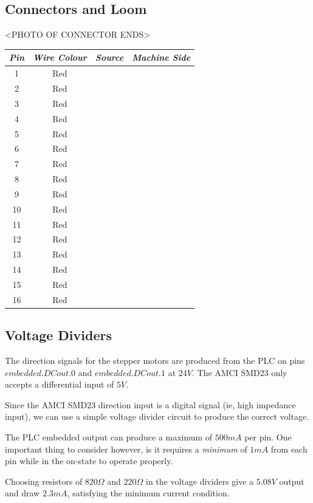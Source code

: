 	\subsection{Connectors and Loom}
		<PHOTO OF CONNECTOR ENDS>
		\begin{table}[h]
			\centering
			\begin{tabular}{cccc}
				\hline
				\emph{Pin} & \emph{Wire Colour} & \emph{Source} & \emph{Machine Side} \\ \hline
				1 & Red & & \\ \hline
				2 & Red & &\\ \hline
				3 & Red & &\\ \hline
				4 & Red & &\\ \hline
				5 & Red & &\\ \hline
				6 & Red & &\\ \hline
				7 & Red & &\\ \hline
				8 & Red & &\\ \hline
				9 & Red & &\\ \hline
				10 & Red & &\\ \hline
				11 & Red & &\\ \hline
				12 & Red & &\\ \hline
				13 & Red & &\\ \hline
				14 & Red & &\\ \hline
				15 & Red & &\\ \hline
				16 & Red & &\\ \hline
			\end{tabular}
		\end{table}
	\subsection{Voltage Dividers}
		The direction signals for the stepper motors are produced from the PLC on pins $embedded.DCout.0$ and $embedded.DCout.1$ at $24V$. The AMCI SMD23 only accepts a differential input of $5V$.
		
		Since the AMCI SMD23 direction input is a digital signal (ie, high impedance input), we can use a simple voltage divider circuit to produce the correct voltage. 
		
		The PLC embedded output can produce a maximum of $500mA$ per pin. One important thing to consider however, is it requires a \emph{minimum} of $1mA$ from each pin while in the on-state to operate properly. 
		
		Choosing resistors of $820\Omega$ and $220\Omega$ in the voltage dividers give a $5.08V$ output and draw $2.3mA$, satisfying the minimum current condition. 
